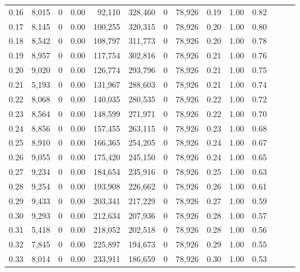\begin{tabular}{rrrrrrrrrrrrrr}
0.16 &   8,015 &      0 &  0.00 &   92,110 &  328,460 &       0 &  78,926 &  0.19 &  1.00 &      0.82 \\
0.17 &   8,145 &      0 &  0.00 &  100,255 &  320,315 &       0 &  78,926 &  0.20 &  1.00 &      0.80 \\
0.18 &   8,542 &      0 &  0.00 &  108,797 &  311,773 &       0 &  78,926 &  0.20 &  1.00 &      0.78 \\
0.19 &   8,957 &      0 &  0.00 &  117,754 &  302,816 &       0 &  78,926 &  0.21 &  1.00 &      0.76 \\
0.20 &   9,020 &      0 &  0.00 &  126,774 &  293,796 &       0 &  78,926 &  0.21 &  1.00 &      0.75 \\
0.21 &   5,193 &      0 &  0.00 &  131,967 &  288,603 &       0 &  78,926 &  0.21 &  1.00 &      0.74 \\
0.22 &   8,068 &      0 &  0.00 &  140,035 &  280,535 &       0 &  78,926 &  0.22 &  1.00 &      0.72 \\
0.23 &   8,564 &      0 &  0.00 &  148,599 &  271,971 &       0 &  78,926 &  0.22 &  1.00 &      0.70 \\
0.24 &   8,856 &      0 &  0.00 &  157,455 &  263,115 &       0 &  78,926 &  0.23 &  1.00 &      0.68 \\
0.25 &   8,910 &      0 &  0.00 &  166,365 &  254,205 &       0 &  78,926 &  0.24 &  1.00 &      0.67 \\
0.26 &   9,055 &      0 &  0.00 &  175,420 &  245,150 &       0 &  78,926 &  0.24 &  1.00 &      0.65 \\
0.27 &   9,234 &      0 &  0.00 &  184,654 &  235,916 &       0 &  78,926 &  0.25 &  1.00 &      0.63 \\
0.28 &   9,254 &      0 &  0.00 &  193,908 &  226,662 &       0 &  78,926 &  0.26 &  1.00 &      0.61 \\
0.29 &   9,433 &      0 &  0.00 &  203,341 &  217,229 &       0 &  78,926 &  0.27 &  1.00 &      0.59 \\
0.30 &   9,293 &      0 &  0.00 &  212,634 &  207,936 &       0 &  78,926 &  0.28 &  1.00 &      0.57 \\
0.31 &   5,418 &      0 &  0.00 &  218,052 &  202,518 &       0 &  78,926 &  0.28 &  1.00 &      0.56 \\
0.32 &   7,845 &      0 &  0.00 &  225,897 &  194,673 &       0 &  78,926 &  0.29 &  1.00 &      0.55 \\
0.33 &   8,014 &      0 &  0.00 &  233,911 &  186,659 &       0 &  78,926 &  0.30 &  1.00 &      0.53 \\

\end{tabular}
